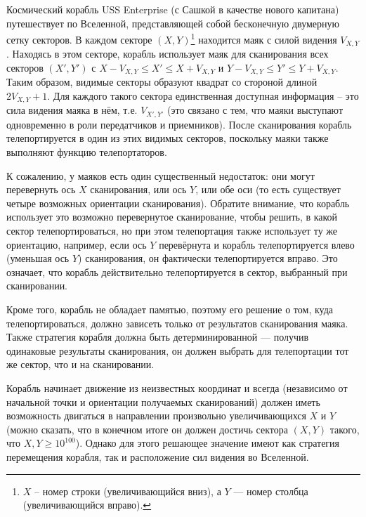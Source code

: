 \documentclass[12pt]{article}
\begin{document}
\renewcommand{\headerLang}{Russian}
\renewcommand{\problemName}{AB13. Vision}

\renewcommand{\headerLeft}{IATI Day 1, Senior group}
\renewcommand{\headerRightFirst}{XVII INTERNATIONAL ADVANCED TOURNAMENT IN INFORMATICS}
\renewcommand{\headerRightSecond}{ONLINE 2026}

\renewcommand{\tl}{$5$ s}
\renewcommand{\ml}{$1024$ MB}
\problem{Task \problemName}

Космический корабль USS Enterprise (с Сашкой в качестве нового капитана) путешествует по Вселенной, представляющей собой бесконечную двумерную сетку секторов. В каждом секторе $(X, Y)$\footnote{$X$ -- номер строки (увеличивающийся вниз), а $Y$ — номер столбца (увеличивающийся вправо).} находится маяк с силой видения $V_{X, Y}$. Находясь в этом секторе, корабль использует маяк для сканирования всех секторов $(X', Y')$ с $X - V_{X, Y} \leq X' \leq X + V_{X, Y}$ и $Y - V_{X, Y} \leq Y' \leq Y + V_{X, Y}$. Таким образом, видимые секторы образуют квадрат со стороной длиной $2V_{X, Y} + 1$. Для каждого такого сектора единственная доступная информация -- это сила видения маяка в нём, т.е. $V_{X', Y'}$ (это связано с тем, что маяки выступают одновременно в роли передатчиков и приемников). После сканирования корабль телепортируется в один из этих видимых секторов, поскольку маяки также выполняют функцию телепортаторов.

К сожалению, у маяков есть один существенный недостаток: они могут перевернуть ось $X$ сканирования, или ось $Y$, или обе оси (то есть существует четыре возможных ориентации сканирования). Обратите внимание, что корабль использует это возможно перевернутое сканирование, чтобы решить, в какой сектор телепортироваться, но при этом телепортация также использует ту же ориентацию, например, если ось $Y$ перевёрнута и корабль телепортируется влево (уменьшая ось $Y$) сканирования, он фактически телепортируется вправо. Это означает, что корабль действительно телепортируется в сектор, выбранный при сканировании.

Кроме того, корабль не обладает памятью, поэтому его решение о том, куда телепортироваться, должно зависеть только от результатов сканирования маяка. Также стратегия корабля должна быть детерминированной — получив одинаковые результаты сканирования, он должен выбрать для телепортации тот же сектор, что и на сканировании.

Корабль начинает движение из неизвестных координат и всегда (независимо от начальной точки и ориентации получаемых сканирований) должен иметь возможность двигаться в направлении произвольно увеличивающихся $X$ и $Y$ (можно сказать, что в конечном итоге он должен достичь сектора $(X, Y)$ такого, что $X, Y \geq 10^{100}$). Однако для этого решающее значение имеют как стратегия перемещения корабля, так и расположение сил видения во Вселенной.
\end{document}
